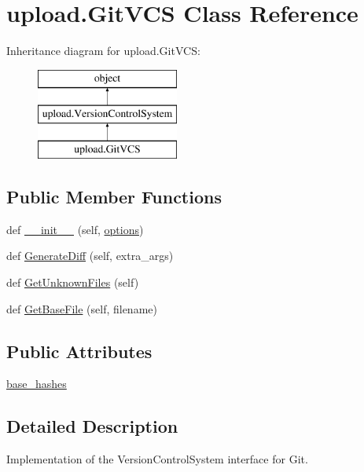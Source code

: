 \hypertarget{classupload_1_1_git_v_c_s}{}\section{upload.\+Git\+V\+C\+S Class Reference}
\label{classupload_1_1_git_v_c_s}
Inheritance diagram for upload.\+Git\+V\+C\+S\+:\begin{figure}[H]
\begin{center}
\leavevmode
\includegraphics[height=3.000000cm]{classupload_1_1_git_v_c_s}
\end{center}
\end{figure}
\subsection*{Public Member Functions}
\begin{DoxyCompactItemize}
\item 
def \hyperlink{classupload_1_1_git_v_c_s_aba4e1dca1c4b3e5db7ba07f6bce3c839}{\+\_\+\+\_\+init\+\_\+\+\_\+} (self, \hyperlink{classupload_1_1_version_control_system_a4d57d043bc408887b94269fe4cea9556}{options})
\item 
def \hyperlink{classupload_1_1_git_v_c_s_a3ebfc01cebc9b585706ad3f4389a8833}{Generate\+Diff} (self, extra\+\_\+args)
\item 
def \hyperlink{classupload_1_1_git_v_c_s_ae4e8c0e9fa01619c6a5c76d1ab84b995}{Get\+Unknown\+Files} (self)
\item 
def \hyperlink{classupload_1_1_git_v_c_s_a70ddb65a6b512b8cb8cc4affa37ff9b4}{Get\+Base\+File} (self, filename)
\end{DoxyCompactItemize}
\subsection*{Public Attributes}
\begin{DoxyCompactItemize}
\item 
\hyperlink{classupload_1_1_git_v_c_s_a07e9469050a157f34fe804cdf6ecddac}{base\+\_\+hashes}
\end{DoxyCompactItemize}


\subsection{Detailed Description}
\begin{DoxyVerb}Implementation of the VersionControlSystem interface for Git.\end{DoxyVerb}
 

